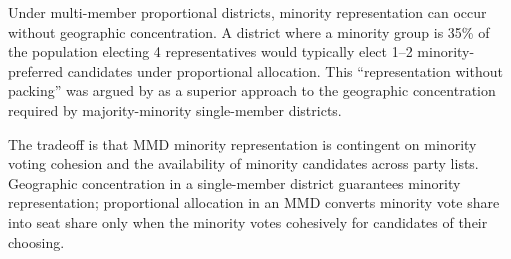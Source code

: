 Under multi-member proportional districts, minority representation can
occur without geographic concentration.  A district where a minority group
is 35\% of the population electing 4 representatives would typically elect
1--2 minority-preferred candidates under proportional allocation.  This
``representation without packing'' was argued by \citet{guinier1994tyranny}
as a superior approach to the geographic concentration required by
majority-minority single-member districts.

The tradeoff is that MMD minority representation is contingent on minority
voting cohesion and the availability of minority candidates across party
lists.  Geographic concentration in a single-member district guarantees
minority representation; proportional allocation in an MMD converts minority
vote share into seat share only when the minority votes cohesively for
candidates of their choosing.

